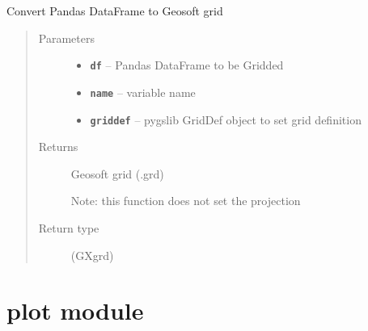 \documentclass[letterpaper,10pt,english]{sphinxmanual}
\begin{document}

\begin{fulllineitems}
\label{index:pygeos.io.to_gxgrid}
Convert Pandas DataFrame to Geosoft grid
\begin{quote}\begin{description}
\item[{Parameters}] \leavevmode\begin{itemize}
\item {} 
\textbf{\texttt{df}} -- Pandas DataFrame to be Gridded

\item {} 
\textbf{\texttt{name}} -- variable name

\item {} 
\textbf{\texttt{griddef}} -- pygslib GridDef object to set grid definition

\end{itemize}

\item[{Returns}] \leavevmode

Geosoft grid (.grd)

Note: this function does not set the projection


\item[{Return type}] \leavevmode
(GXgrd)

\end{description}\end{quote}

\end{fulllineitems}



\chapter{plot module}
\label{index:module-pygeos.plot}\label{index:plot-module}
\end{document}

